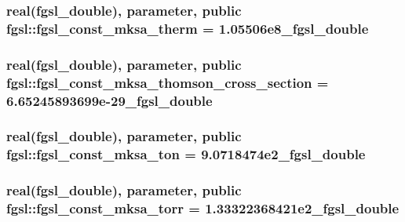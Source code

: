 \subsubsection[{fgsl\+\_\+const\+\_\+mksa\+\_\+therm}]{\setlength{\rightskip}{0pt plus 5cm}real({\bf fgsl\+\_\+double}), parameter, public fgsl\+::fgsl\+\_\+const\+\_\+mksa\+\_\+therm = 1.\+05506e8\+\_\+fgsl\+\_\+double}\label{namespacefgsl_ae80985230902a792be876b10eac1a358}
\hypertarget{namespacefgsl_a6db1579c2961f86ba36e1ec23eea34cf}{}
\subsubsection[{fgsl\+\_\+const\+\_\+mksa\+\_\+thomson\+\_\+cross\+\_\+section}]{\setlength{\rightskip}{0pt plus 5cm}real({\bf fgsl\+\_\+double}), parameter, public fgsl\+::fgsl\+\_\+const\+\_\+mksa\+\_\+thomson\+\_\+cross\+\_\+section = 6.\+65245893699e-\/29\+\_\+fgsl\+\_\+double}\label{namespacefgsl_a6db1579c2961f86ba36e1ec23eea34cf}
\hypertarget{namespacefgsl_a28b9223526d6d5565fda3d778045fee0}{}
\subsubsection[{fgsl\+\_\+const\+\_\+mksa\+\_\+ton}]{\setlength{\rightskip}{0pt plus 5cm}real({\bf fgsl\+\_\+double}), parameter, public fgsl\+::fgsl\+\_\+const\+\_\+mksa\+\_\+ton = 9.\+0718474e2\+\_\+fgsl\+\_\+double}\label{namespacefgsl_a28b9223526d6d5565fda3d778045fee0}
\hypertarget{namespacefgsl_aba0c7c1da846e36ceea84cec02bb6478}{}
\subsubsection[{fgsl\+\_\+const\+\_\+mksa\+\_\+torr}]{\setlength{\rightskip}{0pt plus 5cm}real({\bf fgsl\+\_\+double}), parameter, public fgsl\+::fgsl\+\_\+const\+\_\+mksa\+\_\+torr = 1.\+33322368421e2\+\_\+fgsl\+\_\+double}\label{namespacefgsl_aba0c7c1da846e36ceea84cec02bb6478}
\hypertarget{namespacefgsl_a7046241db07bad6371b685e812c9d177}{}
